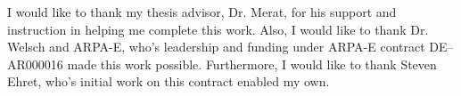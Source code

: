 I would like to thank my thesis advisor, Dr. Merat, for his support and instruction in helping me complete this work. Also, I would like to thank Dr. Welsch and ARPA-E, who's leadership and funding under ARPA-E contract DE--AR000016 made this work possible. Furthermore, I would like to thank Steven Ehret, who's initial work on this contract enabled my own.

